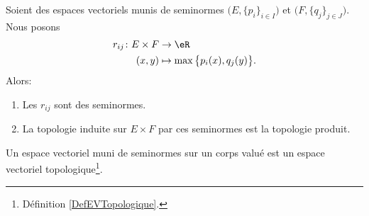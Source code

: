 \begin{proposition}      \label{PROPooNWFZooEFZbNW}
	Soient des espaces vectoriels munis de seminormes \( \big( E,\{ p_i \}_{i\in I} \big) \) et \( \big( F,\{ q_j \}_{j\in J} \big)\). Nous posons
	\begin{equation}        \label{EQooTFVXooORZrFV}
		\begin{aligned}
			r_{ij}\colon E\times F & \to \eR                                   \\
			(x,y)                  & \mapsto \max\big\{ p_i(x), q_j(y) \big\}.
		\end{aligned}
	\end{equation}
	Alors:
	\begin{enumerate}
		\item
		      Les \( r_{ij}\) sont des seminormes.
		\item
		      La topologie induite sur \( E\times F\) par ces seminormes est la topologie produit.
	\end{enumerate}
\end{proposition}

\begin{proposition}       \label{PROPooGXGQooLRTwvH}
	Un espace vectoriel muni de seminormes sur un corps valué est un espace vectoriel topologique\footnote{Définition \ref{DefEVTopologique}.}.
\end{proposition}

